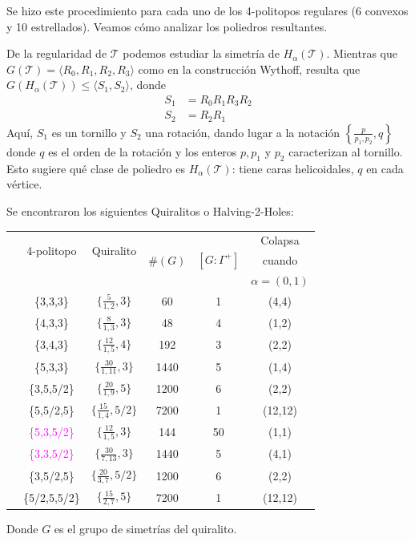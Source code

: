 \documentclass[spanish]{article}
\theoremstyle{definition}
\newcommand{\T}{\mathcal{T}}
\begin{document}
Se hizo este procedimiento para cada uno de los 4-politopos regulares (6 convexos y 10 estrellados). Veamos cómo analizar los poliedros resultantes.

De la regularidad de $\mathcal{T}$ podemos estudiar la simetría de $H_\alpha(\mathcal{T})$. Mientras que $G(\mathcal{T})=\langle R_0,R_1,R_2,R_3\rangle$ como en la construcción Wythoff, resulta que $G(H_\alpha(\mathcal{T}))\leq \langle S_1,S_2\rangle$, donde
\begin{align*}
	S_1&=R_0R_1R_3R_2\\
	S_2&=R_2R_1
\end{align*}
Aquí, $S_1$ es un tornillo y $S_2$ una rotación, dando lugar a la notación $\left\{\frac{p}{p_1,p_2},q\right\}$ donde $q$ es el orden de la rotación y los enteros $p,p_1$ y $p_2$ caracterizan al tornillo. Esto sugiere qué clase de poliedro es $H_\alpha(\mathcal{T})$: tiene caras helicoidales, $q$ en cada vértice.

Se encontraron los siguientes Quiralitos o Halving-2-Holes:

\begin{center}
	\begin{tabular}{|c|c|c|c|c|c|}
		\hline
		&\multirow{2}{*}{4-politopo} &\multirow{2}{*}{Quiralito}&  \multirow{3}{*}{$\#(G)$} &\multirow{3}{*}{$[G:\Gamma^+]$}& Colapsa\\
		&\multirow{2}{*}{ $\T$}&\multirow{2}{*}{$H_\alpha(T)$}&&&cuando\\
		&&&&&$\alpha=(0,1)$ \\
		\hline\hline
		\multirow{5}{*}{\rotatebox{90}{Convexos}}&\{3,3,3\} & $\{\frac{5}{1,2},3\}$ &60& 1 & (4,4) \\
		&\{4,3,3\} & $\{\frac{8}{1,3},3\}$ &48& 4&(1,2) \\
		&\{3,4,3\} & $\{\frac{12}{1,5},4\}$ &192&3&(2,2) \\
		&\{5,3,3\} & $\{\frac{30}{1,11},3\}$ &1440&5&(1,4)\\
		\hline
		\multirow{6}{*}{\rotatebox{90}{Estrellados}}&\{3,5,5/2\} &$\{\frac{20}{1,9},5\}$&1200&6&(2,2)\\
		&\{5,5/2,5\} & $\{\frac{15}{1,4},5/2\}$ &7200&1&(12,12)\\\cline{2-6}
		&\textcolor{magenta}{\{5,3,5/2\}} & $\{\frac{12}{1,5},3\}$ &144&50&(1,1)\\\cline{2-6}
		&\textcolor{magenta}{\{3,3,5/2\}}&$\{\frac{30}{7,13},3\}$& 1440 & 5 &(4,1)\\\cline{2-6}
		&\{3,5/2,5\}& $\{\frac{20}{3,7},5/2\}$ &1200&6& (2,2) \\
		&\{5/2,5,5/2\} & $\{\frac{15}{2,7},5\}$ &7200&1& (12,12)\\
		\hline
	\end{tabular}
\end{center}
Donde $G$ es el grupo de simetrías del quiralito.
\end{document}
